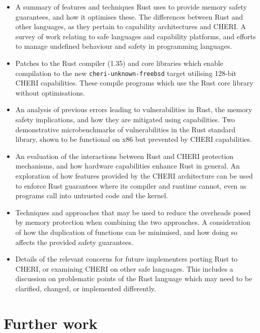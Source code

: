 \documentclass[dissertation.tex]{subfiles}
\begin{document}
\begin{itemize}
    \item A summary of features and techniques Rust uses to provide
    memory safety guarantees, and how it optimises these.
    The differences between Rust and other languages, as they pertain to
    capability architectures and CHERI.
    A survey of work relating to safe languages and capability
    platforms, and efforts to manage undefined behaviour and safety in
    programming languages.

    \item Patches to the Rust compiler (1.35) and core libraries which
    enable compilation to the new \texttt{cheri-unknown-freebsd} target
    utilising 128-bit CHERI capabilities.
    These compile programs which use the Rust core library without
    optimisations.

    \item An analysis of previous errors leading to vulnerabilities in
    Rust, the memory safety implications, and how they are mitigated
    using capabilities.
    Two demonstrative microbenchmarks of vulnerabilities in the Rust
    standard library, shown to be functional on x86 but prevented by
    CHERI capabilities.

    \item An evaluation of the interactions between Rust and CHERI
    protection mechanisms, and how hardware capabilities enhance Rust in
    general.
    An exploration of how features provided by the CHERI architecture
    can be used to enforce Rust guarantees where its compiler and
    runtime cannot, even as programs call into untrusted code and the
    kernel.

    \item Techniques and approaches that may be used to reduce the
    overheads posed by memory protection when combining the two
    approaches.
    A consideration of how the duplication of functions can be
    minimised, and how doing so affects the provided safety guarantees.

    \item Details of the relevant concerns for future implementers
    porting Rust to CHERI, or examining CHERI on other safe languages.
    This includes a discussion on problematic points of the Rust
    language which may need to be clarified, changed, or implemented
    differently.
\end{itemize}

\section{Further work}
\end{document}
